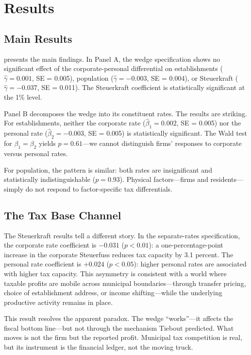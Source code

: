 \documentclass[12pt]{article}
\begin{document}
\section{Results}

\subsection{Main Results}

 presents the main findings. In Panel A, the wedge specification shows no significant effect of the corporate-personal differential on establishments ($\hat{\gamma} = 0.001$, SE = 0.005), population ($\hat{\gamma} = -0.003$, SE = 0.004), or Steuerkraft ($\hat{\gamma} = -0.037$, SE = 0.011). The Steuerkraft coefficient is statistically significant at the 1\% level.

Panel B decomposes the wedge into its constituent rates. The results are striking. For establishments, neither the corporate rate ($\hat{\beta}_1 = 0.002$, SE = 0.005) nor the personal rate ($\hat{\beta}_2 = -0.003$, SE = 0.005) is statistically significant. The Wald test for $\beta_1 = \beta_2$ yields $p = 0.61$---we cannot distinguish firms' responses to corporate versus personal rates.

For population, the pattern is similar: both rates are insignificant and statistically indistinguishable ($p = 0.93$). Physical factors---firms and residents---simply do not respond to factor-specific tax differentials.



\subsection{The Tax Base Channel}

The Steuerkraft results tell a different story. In the separate-rates specification, the corporate rate coefficient is $-0.031$ ($p < 0.01$): a one-percentage-point increase in the corporate Steuerfuss reduces tax capacity by 3.1 percent. The personal rate coefficient is $+0.024$ ($p < 0.05$): higher personal rates are associated with higher tax capacity. This asymmetry is consistent with a world where taxable profits are mobile across municipal boundaries---through transfer pricing, choice of establishment address, or income shifting---while the underlying productive activity remains in place.

This result resolves the apparent paradox. The wedge ``works''---it affects the fiscal bottom line---but not through the mechanism Tiebout predicted. What moves is not the firm but the reported profit. Municipal tax competition is real, but its instrument is the financial ledger, not the moving truck.
\end{document}
